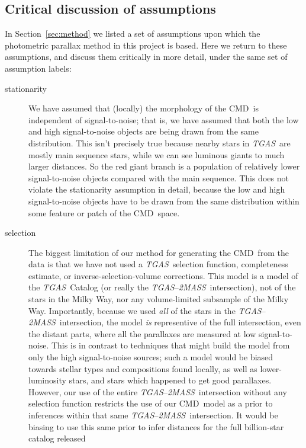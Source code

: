 \documentclass[modern]{aastex61}
\newcommand{\acronym}[1]{{\small{#1}}}
\newcommand{\project}[1]{\textsl{#1}}
\newcommand{\tgas}{\project{\acronym{TGAS}}}
\newcommand{\tmass}{\project{\acronym{2MASS}}}
\newcommand{\cmd}{\acronym{CMD}}
\begin{document}
\subsection{Critical discussion of assumptions}

In Section~\ref{sec:method} we listed a set of assumptions upon which
the photometric parallax method in this project is based.
Here we return to these assumptions, and discuss them critically in more
detail, under the same set of assumption labels:
\begin{description}
\item[stationarity]
  We have assumed that (locally) the morphology of
  the \cmd\ is independent of signal-to-noise; that is, we have assumed that
  both the low and high
  signal-to-noise objects are being drawn from the same distribution.
  This isn't precisely true because nearby stars in \tgas\ are
  mostly main sequence stars, while we can see luminous giants to much larger
  distances. So the red giant branch is a population of
  relatively lower signal-to-noise objects compared with the main
  sequence. This does not violate the stationarity assumption in
  detail, because the low and high signal-to-noise objects have to be
  drawn from the same distribution within some feature or patch of the
  \cmd\ space.
\item[selection] The biggest limitation of our method for generating
  the \cmd\ from the data is that we have not used a
  \tgas\ selection function, completeness estimate, or
  inverse-selection-volume corrections.  This model is a model of the
  \tgas\ Catalog (or really the \tgas--\tmass\ intersection), not of
  the stars in the Milky Way, nor any volume-limited subsample of the
  Milky Way.  Importantly, because we used \emph{all} of the stars in
  the \tgas--\tmass\ intersection, the model \emph{is} representive of
  the full intersection, even the distant parts, where all the
  parallaxes are measured at low signal-to-noise.  This is in contrast
  to techniques that might build the model from only the high
  signal-to-noise sources; such a model would be biased towards
  stellar types and compositions found locally, as well as
  lower-luminosity stars, and stars which happened to get good
  parallaxes.  However, our use of the entire
  \tgas--\tmass\ intersection without any selection function restricts
  the use of our \cmd\ model as a prior to inferences within that same
  \tgas--\tmass\ intersection.  It would be biasing to use this same
  prior to infer distances for the full billion-star catalog released

\end{description}
\end{document}
